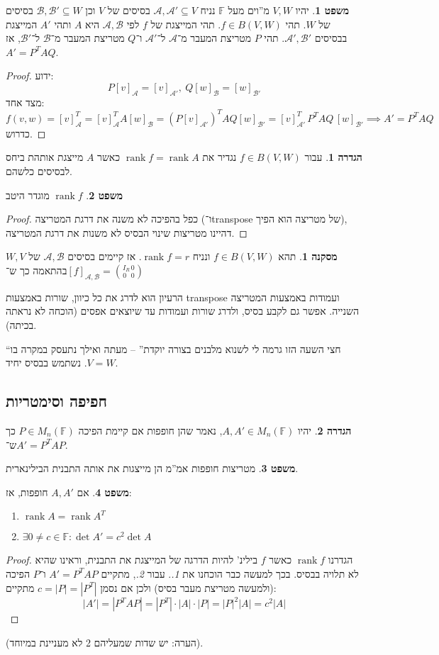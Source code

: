 \documentclass[a4paper]{article}
\newcommand\ac    {\mathcal{A}}
\newcommand\bc    {\mathcal{B}}
\DeclareMathOperator{\rk}      {rank}
\newcommand\F         {\mathbb{F}}
\newcommand\co        {\colon}
\newcommand\sof[1]    {\left | #1 \right |}
\theoremstyle{definition}
\newtheorem{Theorem}{משפט}
\newtheorem{definition}{הגדרה}
\newtheorem{Collary}{מסקנה}
\newcommand\cola [1] {\begin{Collary}#1\end{Collary}}
\newcommand\theo  [1] {\begin{Theorem}#1\end{Theorem}}
\newcommand\defi  [1] {\begin{definition}#1\end{definition}}
\begin{document}
	\theo{יהיו $V, W$ מ''וים מעל $\F$ נניח $\ac, \ac' \subseteq V$ בסיסים של $V$ וכן $\bc, \bc' \subseteq W$ בסיסים של $W$. תהי $f \in B(V, W)$. 
		תהי המייצגת של $f$ לפי $\ac, \bc$ היא $A$ ותהי $A'$ המייצגת בבסיסים $\ac', \bc'$. תהי $P$ מטריצת המעבר מ־$\ac$ ל־$\ac'$ ו־$Q$ מטריצת המעבר מ־$\bc$ ל־$\bc'$, אז $A' = P^T AQ$. 
	}
	\begin{proof}
		ידוע: 
		\[ P[v]_{\ac} = [v]_{\ac'}, \ Q[w]_\bc = [w]_{\bc'} \]
		מצד אחד: 
		\[ f(v, w) = [v]_\ac^T = [v]_{\ac}^T A [w]_\bc = (P[v]_{\ac '})^TAQ[w]_{\bc'} = [v]_{\ac'}^T \, P^T A Q \, [w]_{\bc'} \implies A' = P^T A Q \]
		כדרוש. 
	\end{proof}
	
	\defi{עבור $f \in B(V, W)$ נגדיר את $\rk f = \rk A$ כאשר $A$ מייצגת אותהת ביחס לבסיסים כלשהם. }
	\theo{$\rk f$ מוגדר היטב}
	\begin{proof}
		כפל בהפיכה לא משנה את דרגת המטריצה (ו־transpose של מטריצה הוא הפיך), דהיינו מטריצות שינוי הבסיס לא משנות את דרגת המטריצה. 
	\end{proof}
	
	\cola{תהא $f \in B(V, W)$ ונניח $\rk f = r$. אז קיימים בסיסים $\ac, \bc$ של $W, V$ בהתאמה כך ש־$[f]_{\ac, \bc} = \binom{I_R \, 0}{0\,\,\,\, 0}$}
	הרעיון הוא לדרג את כל כיוון, שורות באמצעות transpose ועמודות באמצעות המטריצה השנייה. אפשר גם לקבע בסיס, ולדרג שורות ועמודות עד שיוצאים אפסים (הוכחה לא נראתה בכיתה). 
	
	``חצי השעה הזו גרמה לי לשנוא מלבנים בצורה יוקדת'' – מעתה ואילך נתעסק במקרה בו $V = W$. נשתמש בבסיס יחיד. 
	
	\subsection{חפיפה וסימטריות}
	\defi{יהיו $A, A' \in M_n(\F)$, נאמר שהן חופפות אם קיימת הפיכה $P \in M_n(\F)$ כך ש־$A' = P^TAP$. }
	\theo{מטריצות חופפות אמ''מ הן מייצגות את אותה התבנית הבילינארית. }
	\theo{אם $A, A'$ חופפות, אז: 
		\begin{enumerate}
			\item \hfil $\rk A = \rk A^T$
			\item \hfil $\exists 0 \neq c \in \F \co \det A' = c^2 \det A$
	\end{enumerate}}
	\begin{proof}
		הגדרנו $\rk f$ כאשר $f$ בילינ' להיות הדרגה של המייצגת את התבנית, וראינו שהיא לא תלויה בבסיס. בכך למעשה כבר הוכחנו את \textit{1.}. עבור \textit{2.}, מתקיים $A' = P^TAP$ ו־$P$ הפיכה (ולמעשה מטריצת מעבר בסיס) ולכן אם נסמן $c = |P| = |P^T|$ מתקיים: 
		\[ |A'| = |P^TAP| = |P^T| \cdot |A| \cdot |P| = \sof{P}^2\sof{A} = c^2 |A| \]
	\end{proof}
	(הערה: יש שדות שמעליהם 2 לא מעניינת במיוחד). 
	
\end{document}
